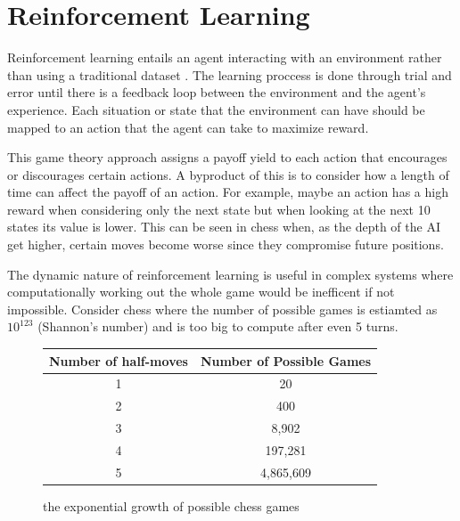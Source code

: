\documentclass[10pt,a4paper]{report}
\begin{document}
	\chapter{Reinforcement Learning}
		Reinforcement learning entails an agent interacting with an environment rather than using a traditional dataset \autocite[p. 105]{DeepLearning}.
		The learning proccess is done through trial and error until there is a feedback loop between the environment and the agent's experience. Each situation
		or state that the environment can have should be mapped to an action that the agent can take to maximize reward. \par
		This game theory approach assigns a payoff yield to each action that encourages or discourages certain actions.
		A byproduct of this is to consider how a length of time can affect the payoff of an action. For example, maybe an action has
		a high reward when considering only the next state but when looking at the next 10 states its value is lower. This can be seen
		in chess when, as the depth of the AI get higher, certain moves become worse since they compromise future positions. \par
		The dynamic nature of reinforcement learning is useful in complex systems where computationally working out the whole game would be inefficent if not impossible.
		Consider chess \autocite{shannon1950xxii} where the number of possible games is estiamted as $10^{123}$ (Shannon's number) and is too big to compute after even 5 turns.
		\begin{figure}[h]
			\centering
			\begin{tabular}{||c c||}
				\hline
				Number of half-moves & Number of Possible Games\\ [0.5ex]
				\hline\hline
				1 & 20\\
				\hline
				2 & 400\\
				\hline
				3 & 8,902\\
				\hline
				4 & 197,281\\
				\hline
				5 & 4,865,609\\[1ex]
				\hline
			\end{tabular}
			\caption{the exponential growth of possible chess games}
			\label{fig:possible-chess-games}
		\end{figure}
\end{document}
